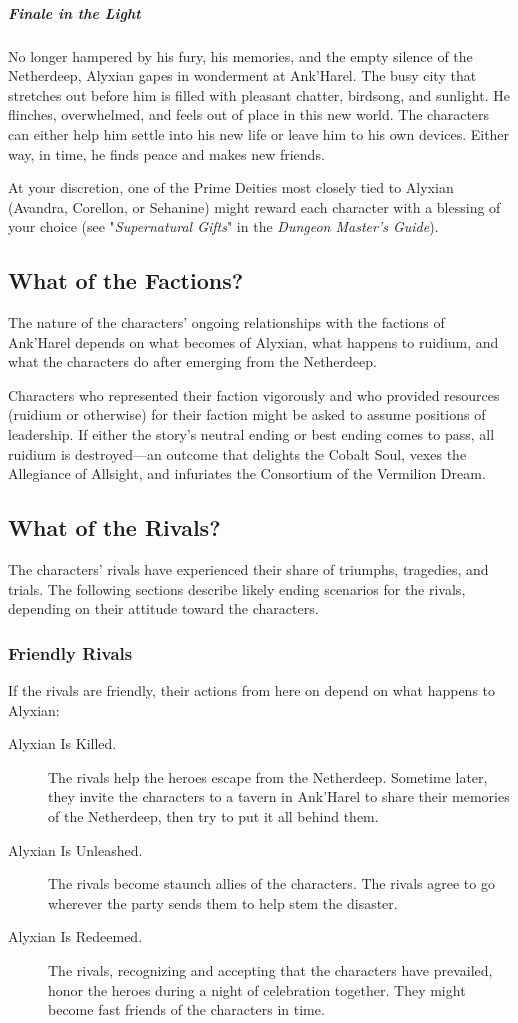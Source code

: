 \documentclass[10pt,a4paper,twoside,fancy,bg=print,twocolumn,openany,nodeprecatedcode]{dndbook}
\begin{document}
\subparagraph{Finale in the Light}
No longer hampered by his fury, his memories, and the empty silence of the Netherdeep, Alyxian gapes in wonderment at Ank'Harel. The busy city that stretches out before him is filled with pleasant chatter, birdsong, and sunlight. He flinches, overwhelmed, and feels out of place in this new world. The characters can either help him settle into his new life or leave him to his own devices. Either way, in time, he finds peace and makes new friends.

At your discretion, one of the Prime Deities most closely tied to Alyxian (Avandra, Corellon, or Sehanine) might reward each character with a blessing of your choice (see "\textit{Supernatural Gifts}" in the \textit{Dungeon Master's Guide}).

\subsection{What of the Factions?}
The nature of the characters' ongoing relationships with the factions of Ank'Harel depends on what becomes of Alyxian, what happens to ruidium, and what the characters do after emerging from the Netherdeep.

Characters who represented their faction vigorously and who provided resources (ruidium or otherwise) for their faction might be asked to assume positions of leadership. If either the story's neutral ending or best ending comes to pass, all ruidium is destroyed—an outcome that delights the Cobalt Soul, vexes the Allegiance of Allsight, and infuriates the Consortium of the Vermilion Dream.

\subsection{What of the Rivals?}
The characters' rivals have experienced their share of triumphs, tragedies, and trials. The following sections describe likely ending scenarios for the rivals, depending on their attitude toward the characters.

\subsubsection{Friendly Rivals}
If the rivals are friendly, their actions from here on depend on what happens to Alyxian:


\begin{description}
\item[Alyxian Is Killed.]
The rivals help the heroes escape from the Netherdeep. Sometime later, they invite the characters to a tavern in Ank'Harel to share their memories of the Netherdeep, then try to put it all behind them.
\item[Alyxian Is Unleashed.]
The rivals become staunch allies of the characters. The rivals agree to go wherever the party sends them to help stem the disaster.
\item[Alyxian Is Redeemed.]
The rivals, recognizing and accepting that the characters have prevailed, honor the heroes during a night of celebration together. They might become fast friends of the characters in time.
\end{description}
\end{document}
